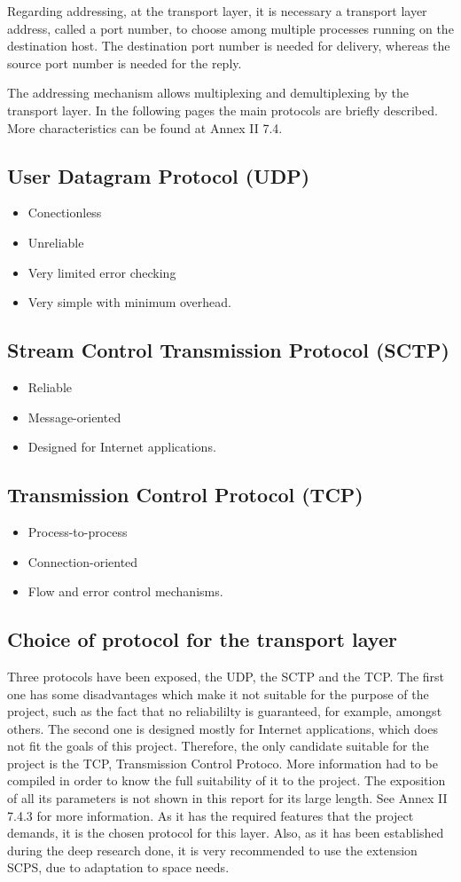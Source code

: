 Regarding addressing, at the transport layer, it is necessary a transport layer address, called a port number, to choose among multiple processes running on the destination host. The destination port number is needed for delivery, whereas the source port number is needed for the reply. 

The addressing mechanism allows multiplexing and demultiplexing by the transport layer. In the following pages the main protocols are briefly described. More characteristics can be found at Annex II 7.4.
\subsection{User Datagram Protocol (UDP)}
\begin{itemize}
\item Conectionless
\item Unreliable
\item Very limited error checking
\item Very simple with minimum overhead.
\end{itemize}
\subsection{Stream Control Transmission Protocol (SCTP)}
\begin{itemize}
\item Reliable
\item Message-oriented
\item Designed for Internet applications.
\end{itemize}
\subsection{ Transmission Control Protocol (TCP)}
\begin{itemize}
\item Process-to-process 
\item Connection-oriented
\item Flow and error control mechanisms.
\end{itemize}
\subsection{Choice of protocol for the transport layer}
Three protocols have been exposed, the UDP, the SCTP and the TCP. The first one has some disadvantages which make it not suitable for the purpose of the project, such as the fact that no reliabililty is guaranteed, for example, amongst others. The second one is designed mostly for Internet applications, which does not fit the goals of this project. Therefore, the only candidate suitable for the project is the TCP, Transmission Control Protoco. More information had to be compiled in order to know the full suitability of it to the project. The exposition of all its parameters is not shown in this report for its large length. See Annex II 7.4.3 for more information.  As it has the required features that the project demands, it is the chosen protocol for this layer. Also, as it has been established during the deep research done, it is very recommended to use the extension SCPS, due to adaptation to space needs.  

%
